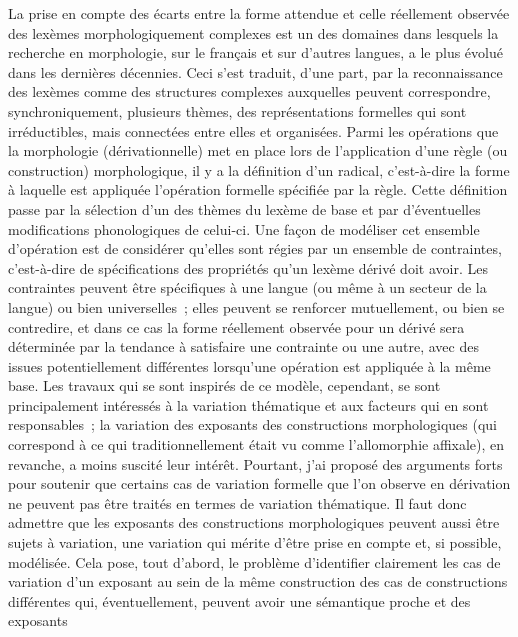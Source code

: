 \documentclass[output=paper]{langsci/langscibook}
\begin{document}
La prise en compte des écarts entre la forme attendue et celle
réellement observée des lexèmes morphologiquement complexes est un des
domaines dans lesquels la recherche en morphologie, sur le français et
sur d'autres langues, a le plus évolué dans les dernières décennies.
Ceci s'est traduit, d'une part, par la reconnaissance des lexèmes comme
des structures complexes auxquelles peuvent correspondre,
synchroniquement, plusieurs thèmes, des représentations formelles qui
sont irréductibles, mais connectées entre elles et organisées. Parmi les
opérations que la morphologie (dérivationnelle) met en place lors de
l'application d'une règle (ou construction) morphologique, il y a la
définition d'un radical, c'est-à-dire la forme à laquelle est appliquée
l'opération formelle spécifiée par la règle. Cette définition passe par
la sélection d'un des thèmes du lexème de base et par d'éventuelles
modifications phonologiques de celui-ci. Une façon de modéliser cet
ensemble d'opération est de considérer qu'elles sont régies par un
ensemble de contraintes, c'est-à-dire de spécifications des propriétés
qu'un lexème dérivé doit avoir. Les contraintes peuvent être spécifiques
à une langue (ou même à un secteur de la langue) ou bien universelles~;
elles peuvent se renforcer mutuellement, ou bien se contredire, et dans
ce cas la forme réellement observée pour un dérivé sera déterminée par
la tendance à satisfaire une contrainte ou une autre, avec des issues
potentiellement différentes lorsqu'une opération est appliquée à la même
base. Les travaux qui se sont inspirés de ce modèle, cependant, se sont
principalement intéressés à la variation thématique et aux facteurs qui
en sont responsables~; la variation des exposants des constructions
morphologiques (qui correspond à ce qui traditionnellement était vu
comme l'allomorphie affixale), en revanche, a moins suscité leur
intérêt. Pourtant, j'ai proposé des arguments forts pour soutenir que
certains cas de variation formelle que l'on observe en dérivation ne
peuvent pas être traités en termes de variation thématique. Il faut donc
admettre que les exposants des constructions morphologiques peuvent
aussi être sujets à variation, une variation qui mérite d'être prise en
compte et, si possible, modélisée. Cela pose, tout d'abord, le problème
d'identifier clairement les cas de variation d'un exposant au sein de la
même construction des cas de constructions différentes qui,
éventuellement, peuvent avoir une sémantique proche et des exposants
\end{document}
